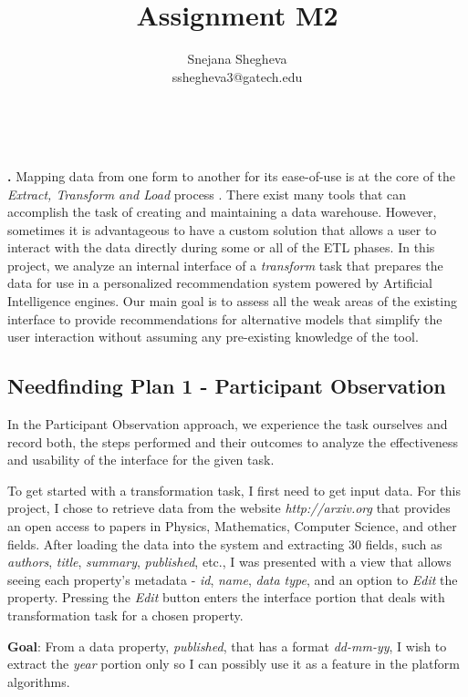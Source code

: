 \documentclass[12pt,letterpaper]{article}
\makeatletter
\renewcommand{\maketitle}{\bgroup
   \begin{center}
   \textbf{{\fontsize{18pt}{20}\selectfont \@title}}\\
   \vspace{10pt}
   {\fontsize{12pt}{0}\selectfont \@author} 
   \end{center}
}
\newenvironment{myquote}[1]%
  {\list{}{\leftmargin=#1\rightmargin=#1}\item[]}%
  {\endlist}
\renewenvironment{abstract}
{\vspace*{-.5in}\fontsize{12pt}{12}\begin{myquote}{.5in}
\noindent \par{\bfseries \abstractname.}}
{\medskip\noindent
\end{myquote}
}
\makeatother
\begin{document}
\title{Assignment M2}
\author{Snejana Shegheva \\ sshegheva3@gatech.edu}

\maketitle
\thispagestyle{fancy}

\begin{abstract}
Mapping data from one form to another for its ease-of-use is at the core of the \textit{Extract, Transform and Load} process \cite{wiki:etl}. There exist many tools that can accomplish the task of creating and maintaining a data warehouse. However, sometimes it is advantageous to have a custom solution that allows a user to interact with the data directly during some or all of the ETL phases. In this project, we analyze an internal interface of a \textit{transform} task that prepares the data for use in a personalized recommendation system powered by Artificial Intelligence engines. Our main goal is to assess all the weak areas of the existing interface to provide recommendations for alternative models that simplify the user interaction without assuming any pre-existing knowledge of the tool.
\end{abstract}

\subsection*{Needfinding Plan 1 - Participant Observation}
In the Participant Observation approach, we experience the task ourselves and record both, the steps performed and their outcomes to analyze the effectiveness and usability of the interface for the given task. 

To get started with a transformation task, I first need to get input data. For this project, I chose to retrieve data from the website \textit{http://arxiv.org} that provides an open access to papers in Physics, Mathematics, Computer Science, and other fields. After loading the data into the system and extracting 30 fields, such as \textit{authors}, \textit{title}, \textit{summary}, \textit{published}, etc., I was presented with a view that allows seeing each property's metadata - \textit{id}, \textit{name}, \textit{data type}, and an option to \textit{Edit} the property. Pressing the \textit{Edit} button enters the interface portion that deals with transformation task for a chosen property.    

\textbf{Goal}: From a data property, \textit{published}, that has a format \textit{dd-mm-yy}, I wish to extract the \textit{year} portion only so I can possibly use it as a feature in the platform algorithms. 
\end{document}
